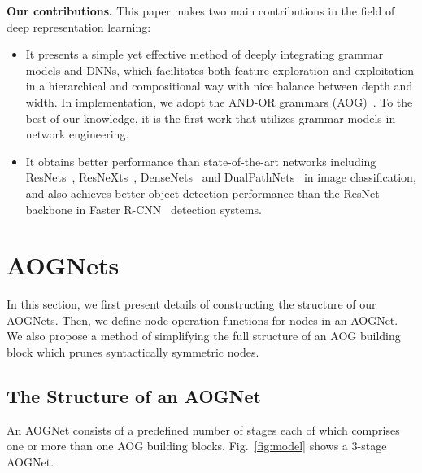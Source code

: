 \documentclass[10pt,twocolumn,letterpaper]{article}
\begin{document}
\textbf{Our contributions.} This paper makes two main contributions in the field of deep representation learning: 
\begin{itemize}[leftmargin=*]
\itemsep0em
    \item It presents a simple yet effective method of deeply integrating grammar models and DNNs, which facilitates both feature exploration and exploitation in a hierarchical and compositional way with nice balance between depth and width. In implementation, we adopt the AND-OR grammars (AOG)~\cite{DisAOT-CVPR,Zhu_Grammar,Yuille_AndOr}. To the best of our knowledge, it is the first work that utilizes grammar models in network engineering. %
    \item It obtains better performance than state-of-the-art networks including ResNets~\cite{ResidualNet}, ResNeXts~\cite{ResNeXt}, DenseNets~\cite{DenseNet} and DualPathNets~\cite{DPN} in image classification, and also achieves better object detection performance than the ResNet backbone in Faster R-CNN~\cite{FasterRCNN} detection systems. 
\end{itemize}





\section{AOGNets} \label{sec:AOGNets}
In this section, we first present details of constructing the structure of our AOGNets. Then, we define node operation functions for nodes in an AOGNet. We also propose a method of simplifying the full structure of an AOG building block which prunes syntactically symmetric nodes.  

\subsection{The Structure of an AOGNet} \label{sec:structure}
An AOGNet consists of a predefined number of stages each of which comprises one or more than one AOG building blocks.  Fig.~\ref{fig:model} shows a 3-stage AOGNet. 
\end{document}
